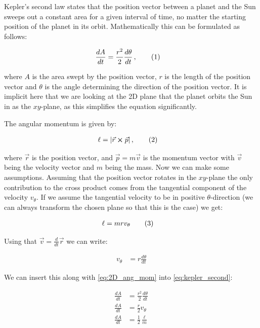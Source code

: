 \documentclass[reprint,english,notitlepage]{revtex4-1}  %
\newcommand\numberthis{\addtocounter{equation}{1}\tag{\theequation}}
\begin{document}
Kepler's second law states that the position vector between a planet and the Sun sweeps out a constant area for a given interval of time, no matter the starting position of the planet in its orbit. Mathematically this can be formulated as follows:

\begin{align*}
\frac{dA}{dt} &= \frac{r^2}{2} \frac{d\theta}{dt} \, , \numberthis \label{eq:kepler_second}
\end{align*}   

where $A$ is the area swept by the position vector, $r$ is the length of the position vector and $\theta$ is the angle determining the direction of the position vector. It is implicit here that we are looking at the 2D plane that the planet orbits the Sun in as the $xy$-plane, as this simplifies the equation significantly. 

The angular momentum is given by:

\begin{align*}
\ell &= |\vec{r} \cross \vec{p}| \, ,\numberthis \label{eq:ang_mom}
\end{align*}

where $\vec{r}$ is the position vector, and $\vec{p} = m \vec{v}$ is the momentum vector with $\vec{v}$ being the velocity vector and $m$ being the mass. Now we can make some assumptions. Assuming that the position vector rotates in the $xy$-plane the only contribution to the cross product comes from the tangential component of the velocity $v_\theta$. If we assume the tangential velocity to be in positive $\theta$-direction (we can always transform the chosen plane so that this is the case) we get:

\begin{align*}
\ell &= mrv_\theta \numberthis \label{eq:2D_ang_mom}
\end{align*}

Using that $\vec{v} = \frac{d}{dt} \vec{r}$ we can write:

\begin{align*}
v_\theta &= r \frac{d\theta}{dt}
\end{align*}

We can insert this along with \eqref{eq:2D_ang_mom} into \eqref{eq:kepler_second}:

\begin{align*}
\frac{dA}{dt} &= \frac{r^2}{2} \frac{d\theta}{dt} \\
\frac{dA}{dt} &= \frac{r}{2} v_\theta \\
\frac{dA}{dt} &= \frac{1}{2} \frac{\ell}{m} 
\end{align*}
\end{document}
